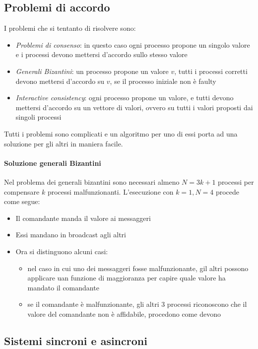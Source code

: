 \subsection{Problemi di accordo}
I problemi che si tentanto di risolvere sono:
\begin{itemize}
    \item \emph{Problemi di consenso}: in questo caso ogni processo 
    propone un singolo valore e i processi devono mettersi d'accordo 
    sullo stesso valore
    \item \emph{Generali Bizantini}: un processo propone un valore $v$, 
    tutti i processi corretti devono mettersi d'accordo su $v$, se 
    il processo iniziale non è faulty
    \item \emph{Interactive consistency}: ogni processo propone un valore, 
    e tutti devono mettersi d'accordo su un vettore di valori, 
    ovvero su tutti i valori proposti dai singoli processi
\end{itemize}

Tutti i problemi sono complicati e un algoritmo per uno di essi 
porta ad una soluzione per gli altri in maniera facile.

\paragraph{Soluzione generali Bizantini}
Nel problema dei generali bizantini sono necessari almeno 
$N = 3k + 1$ processi per compensare $k$ processi malfunzionanti.
L'esecuzione con $k = 1, N = 4$ procede come segue: 
\begin{itemize}
    \item Il comandante manda il valore ai messaggeri
    \item Essi mandano in broadcast agli altri
    \item Ora si distinguono alcuni casi:
    \begin{itemize}
        \item nel caso in cui uno dei messaggeri fosse malfunzionante, 
        gil altri possono applicare uan funzione di maggioranza 
        per capire quale valore ha mandato il comandante
        \item se il comandante è malfunzionante, gli altri 3 processi 
        riconoscono che il valore del comandante non è affidabile, 
        procedono come devono
    \end{itemize}
\end{itemize}

\subsection{Sistemi sincroni e asincroni}

